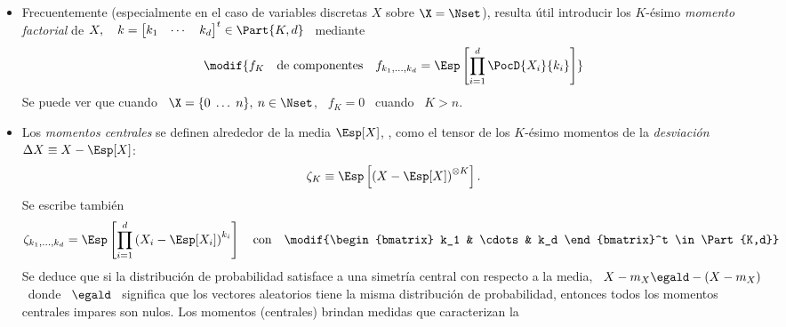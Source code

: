 \begin{itemize}
{    alcance}, en el  sentido de que no cae a 0  suficientemente r\'apido con $x$
  para  $x$  grandes, algunos  momentos  pueden  no  existir.  Por  ejemplo,  la
  distribuci\'on   de   probabilidad   de   Cauchy--Lorentz  (o   funci\'on   de
  Breit--Wigner), dada  por \ $p_X(x)  = \modif{\frac{\Gamma\left( \frac{d+1}{2}
      \right)}{\pi^{\frac{d+1}{2}} \, \left| R \right|^{\frac12}}} \, \left( 1 +
    (x-x_0)^t R^{-1}  (x-x_0) \right)^{-  \, \frac{d+1}{2}}$ \  sobre $\Rset^d$,
  con  \ , no  tiene momentos
  finitos de orden $K \geq 1$.
%
\item Frecuentemente (especialmente en el  caso de variables discretas $X$ sobre
  $\X  =  \Nset$),  resulta   \'util  introducir  los  $K$-\'esimo  {\it  momento
    factorial}   de   $X,  \quad   k   =   \begin{bmatrix}   k_1  &   \cdots   &
    k_d \end{bmatrix}^t \in \Part{K,d}$
 \ mediante 
  \[
  \modif{f_K \quad  \mbox{de componentes} \quad  f_{k_1,\ldots,k_d} = \Esp\left[
      \prod_{i=1}^d \PocD{X_i}{k_i} \right]}
 \]
   Se puede
 ver que cuando \ $\X  = \{ 0 \; \ldots \; n \}, \: n \in  \Nset$, \ $f_K = 0$ \
 cuando \ $K > n$.
%
\item Los {\it  momentos centrales} se definen alrededor  de la media $\Esp[X]$,
  \ie, como  el tensor de  los $K$-\'esimo momentos  de la {\it  desviaci\'on} \
  $\Delta X \equiv X-\Esp[X]$:
  \[
  \zeta_K \equiv \Esp\left[  \left( X - \Esp[X] \right)^{\otimes K} \right].
  \]
  Se escribe tambi\'en
  \[
  \zeta_{k_1,\ldots,k_d}   =  \Esp\left[   \prod_{i=1}^d   \left(  X_i-\Esp[X_i]
    \right)^{k_i}  \right] \quad \mbox{con}  \quad \modif{\begin{bmatrix}  k_1 &
      \cdots & k_d \end{bmatrix}^t \in \Part{K,d}}
  \]
  Se deduce que si la  distribuci\'on de probabilidad satisface a una simetr\'ia
  central  con respecto a  la media,  \ie \  $X-m_X \egald  -(X-m_X)$ \  donde \
  $\egald$ \ significa que los vectores aleatorios tiene la misma distribuci\'on
  de probabilidad, entonces todos los momentos centrales impares son nulos.  Los
  momentos     (centrales)    brindan     medidas     que    caracterizan     la

\end{itemize}
